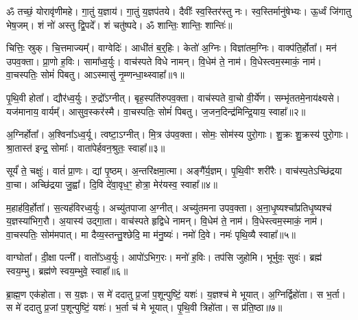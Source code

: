 \setcounter{anuvakam}{0}
ॐ तच्छं॒ योरावृ॑णीमहे। 
गा॒तुं य॒ज्ञाय॑। 
गा॒तुं य॒ज्ञप॑तये। 
दैवीः᳚ स्व॒स्तिर॑स्तु नः। 
स्व॒स्तिर्मानु॑षेभ्यः। 
ऊ॒र्ध्वं जि॑गातु भेष॒जम्। 
शं नो॑ अस्तु द्वि॒पदे᳚। 
शं चतु॑ष्पदे। 
ॐ शान्तिः॒ शान्तिः॒ शान्तिः॑॥

चित्तिः॒ स्रुक्। 
चि॒त्तमाज्यम्᳚। 
वाग्वेदिः॑। 
आधी॑तं ब॒र्॒‌हिः। 
केतो॑ अ॒ग्निः। 
विज्ञा॑तम॒ग्निः। 
वाक्प॑ति॒र्\mbox{}होता᳚। 
मन॑ उपव॒क्ता। 
प्रा॒णो ह॒विः। 
सामा᳚ध्व॒र्युः। 
वाच॑स्पते विधे नामन्। 
वि॒धेम॑ ते॒ नाम॑। 
वि॒धेस्त्वम॒स्माकं॒ नाम॑। 
वा॒चस्पतिः॒ सोमं॑ पिबतु। 
आऽस्मासु॑ नृ॒म्णन्धा॒थ्स्वाहा᳚॥१॥\ip
\anuvakamend[अ॒ध्व॒र्युः पञ्च॑ च]

पृ॒थि॒वी होता᳚। 
द्यौर॑ध्व॒र्युः। 
रु॒द्रो᳚ऽग्नीत्। 
बृह॒स्पति॑रुपव॒क्ता। 
वाच॑स्पते वा॒चो वी॒र्ये॑ण। 
सम्भृ॑ततमे॒नाय॑क्ष्यसे। 
यज॑मानाय॒ वार्यम्᳚। 
आसुव॒स्कर॑स्मै। 
वा॒चस्पतिः॒ सोमं॑ पिबतु। 
ज॒जन॒दिन्द्र॑\-मिन्द्रि॒याय॒ स्वाहा᳚॥२॥\ip%
\anuvakamend[पृ॒थि॒वी होता॒ दश॑]

अ॒ग्निर्\mbox{}होता᳚। 
अ॒श्विना᳚ऽध्व॒र्यू। 
त्वष्टा॒ऽग्नीत्। 
मि॒त्र उ॑पव॒क्ता। 
सोमः॒ सोम॑स्य पुरो॒गाः। 
शु॒क्रः  शु॒क्रस्य॑ पुरो॒गाः। 
श्रा॒तास्त॑ इन्द्र॒ सोमाः᳚। 
वाता॑पेर्\mbox{}हवन॒श्रुतः॒ स्वाहा᳚॥३॥\ip%
\anuvakamend[अ॒ग्निर्होता॒ऽष्टौ]

सूर्यं॑ ते॒ चक्षुः॑। 
वातं॑ प्रा॒णः। 
द्यां पृ॒ष्ठम्। 
अ॒न्तरि॑क्षमा॒त्मा। 
अङ्गै᳚र्\mbox{}य॒ज्ञम्। 
पृ॒थि॒वीꣳ शरी॑रैः। 
वाच॑स्प॒तेऽच्छि॑द्रया वा॒चा। 
अच्छि॑द्रया जु॒ह्वा᳚। 
दि॒वि दे॑वा॒वृध॒ꣳ॒ होत्रा॒ मेर॑यस्व॒ स्वाहा᳚॥४॥\ip%
\anuvakamend[सूर्यं॑ ते॒ नव॑]

म॒हाह॑वि॒र्\mbox{}होता᳚। 
स॒त्यह॑विरध्व॒र्युः। 
अच्यु॑तपाजा अ॒ग्नीत्। 
अच्यु॑तमना उपव॒क्ता। 
अ॒ना॒धृ॒ष्यश्चा᳚प्रतिधृ॒ष्यश्च॑ य॒ज्ञस्या॑भिग॒रौ। 
अ॒यास्य॑ उद्गा॒ता। 
वाच॑स्पते हृद्विधे नामन्। 
वि॒धेम॑ ते॒ नाम॑। 
वि॒धेस्त्वम॒स्माकं॒ नाम॑। 
वा॒चस्पतिः॒ सोम॑मपात्। 
मा दैव्य॒स्तन्तु॒श्छेदि॒ मा म॑नु॒ष्यः॑। 
नमो॑ दि॒वे। 
नमः॑ पृथि॒व्यै स्वाहा᳚॥५॥\ip%
\anuvakamend[अ॒पा॒त्त्रीणि॑ च]

वाग्घोता᳚। 
दी॒क्षा पत्नी᳚। 
वातो᳚ऽध्व॒र्युः। 
आपो॑ऽभिग॒रः। 
मनो॑ ह॒विः। 
तप॑सि जुहोमि। 
भूर्भुवः॒ सुवः॑। 
ब्रह्म॑ स्वय॒म्भु। 
ब्रह्म॑णे स्वय॒म्भुवे॒ स्वाहा᳚॥६॥\ip
\anuvakamend[वाग्घोता॒ नव॑]

ब्रा॒ह्म॒ण एक॑होता। 
स य॒ज्ञः। 
स मे॑ ददातु प्र॒जां प॒शून्पुष्टिं॒ यशः॑। 
य॒ज्ञश्च॑ मे भूयात्। 
अ॒ग्निर्द्विहो॑ता। 
स भ॒र्ता। 
स मे॑ ददातु प्र॒जां प॒शून्पुष्टिं॒ यशः॑। 
भ॒र्ता च॑ मे भूयात्। 
पृ॒थि॒वी त्रिहो॑ता। 
स प्र॑ति॒ष्ठा॥७॥\ip

